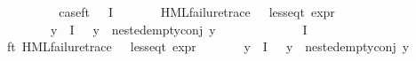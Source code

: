 \begin{isabellebody}
\ \ \isamarkupfalse%
\isanewline
\ \ \ \ \isamarkupfalse%
\ case{\isacharunderscore}{\kern0pt}ft{\isacharcolon}{\kern0pt}\ {\isachardoublequoteopen}{\isacharparenleft}{\kern0pt}{\isasymexists}{\isasympsi}{\isasymin}{\isasymPhi}\ {\isacharbackquote}{\kern0pt}\ I{\isachardot}{\kern0pt}\isanewline
\ \ \ \ \ \ \ {\isacharparenleft}{\kern0pt}HML{\isacharunderscore}{\kern0pt}failure{\isacharunderscore}{\kern0pt}trace\ {\isasympsi}\ {\isasymand}\ less{\isacharunderscore}{\kern0pt}eq{\isacharunderscore}{\kern0pt}t\ {\isacharparenleft}{\kern0pt}expr\ {\isasympsi}{\isacharparenright}{\kern0pt}\ {\isacharparenleft}{\kern0pt}{\isasyminfinity}{\isacharcomma}{\kern0pt}\ {\isasyminfinity}{\isacharcomma}{\kern0pt}\ {\isasyminfinity}{\isacharcomma}{\kern0pt}\ {}{\isacharcomma}{\kern0pt}\ {}{\isacharcomma}{\kern0pt}\ {}{\isacharparenright}{\kern0pt}{\isacharparenright}{\kern0pt}\ {\isasymand}\isanewline
\ \ \ \ \ \ \ {\isacharparenleft}{\kern0pt}{\isasymforall}y{\isasymin}{\isasymPhi}\ {\isacharbackquote}{\kern0pt}\ I{\isachardot}{\kern0pt}\ {\isasympsi}\ {\isasymnoteq}\ y\ {\isasymlongrightarrow}\ nested{\isacharunderscore}{\kern0pt}empty{\isacharunderscore}{\kern0pt}conj\ y{\isacharparenright}{\kern0pt}{\isacharparenright}{\kern0pt}{\isachardoublequoteclose}\isanewline
\ \ \ \ \isamarkupfalse%
\ \isamarkupfalse%
\ {\isasympsi}\ \ {\isachardoublequoteopen}{\isasympsi}\ {\isasymin}\ {\isasymPhi}\ {\isacharbackquote}{\kern0pt}\ I{\isachardoublequoteclose}\ \isanewline
{\isasympsi}{\isacharunderscore}{\kern0pt}ft{\isacharcolon}{\kern0pt}\ {\isachardoublequoteopen}{\isacharparenleft}{\kern0pt}HML{\isacharunderscore}{\kern0pt}failure{\isacharunderscore}{\kern0pt}trace\ {\isasympsi}\ {\isasymand}\ less{\isacharunderscore}{\kern0pt}eq{\isacharunderscore}{\kern0pt}t\ {\isacharparenleft}{\kern0pt}expr\ {\isasympsi}{\isacharparenright}{\kern0pt}\ {\isacharparenleft}{\kern0pt}{\isasyminfinity}{\isacharcomma}{\kern0pt}\ {\isasyminfinity}{\isacharcomma}{\kern0pt}\ {\isasyminfinity}{\isacharcomma}{\kern0pt}\ {}{\isacharcomma}{\kern0pt}\ {}{\isacharcomma}{\kern0pt}\ {}{\isacharparenright}{\kern0pt}{\isacharparenright}{\kern0pt}{\isachardoublequoteclose}\isanewline
{\isachardoublequoteopen}{\isacharparenleft}{\kern0pt}{\isasymforall}y{\isasymin}{\isasymPhi}\ {\isacharbackquote}{\kern0pt}\ I{\isachardot}{\kern0pt}\ {\isasympsi}\ {\isasymnoteq}\ y\ {\isasymlongrightarrow}\ nested{\isacharunderscore}{\kern0pt}empty{\isacharunderscore}{\kern0pt}conj\ y{\isacharparenright}{\kern0pt}{\isachardoublequoteclose}\isanewline

\end{isabellebody}
